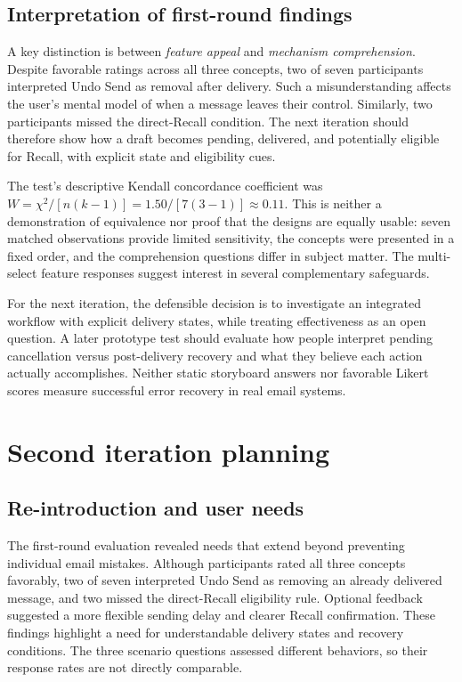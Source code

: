 \documentclass[letterpaper]{jdf}
\begin{document}
\subsection{Interpretation of first-round findings}
A key distinction is between \emph{feature appeal} and \emph{mechanism comprehension}. Despite favorable ratings across all three concepts, two of seven participants interpreted Undo Send as removal after delivery. Such a misunderstanding affects the user's mental model of when a message leaves their control. Similarly, two participants missed the direct-Recall condition. The next iteration should therefore show how a draft becomes pending, delivered, and potentially eligible for Recall, with explicit state and eligibility cues.

The test's descriptive Kendall concordance coefficient was $W=\chi^2/[n(k-1)]=1.50/[7(3-1)]\approx0.11$. This is neither a demonstration of equivalence nor proof that the designs are equally usable: seven matched observations provide limited sensitivity, the concepts were presented in a fixed order, and the comprehension questions differ in subject matter. The multi-select feature responses suggest interest in several complementary safeguards.

For the next iteration, the defensible decision is to investigate an integrated workflow with explicit delivery states, while treating effectiveness as an open question. A later prototype test should evaluate how people interpret pending cancellation versus post-delivery recovery and what they believe each action actually accomplishes. Neither static storyboard answers nor favorable Likert scores measure successful error recovery in real email systems.

\section{Second iteration planning}

\subsection{Re-introduction and user needs}
The first-round evaluation revealed needs that extend beyond preventing individual email mistakes. Although participants rated all three concepts favorably, two of seven interpreted Undo Send as removing an already delivered message, and two missed the direct-Recall eligibility rule. Optional feedback suggested a more flexible sending delay and clearer Recall confirmation. These findings highlight a need for understandable delivery states and recovery conditions. The three scenario questions assessed different behaviors, so their response rates are not directly comparable.
\end{document}
